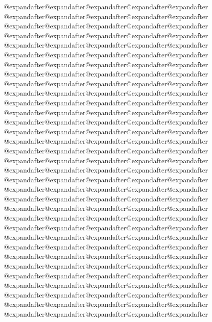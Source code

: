 {{                  @expandafter@expandafter@expandafter@expandafter@expandafter%
                  @expandafter@expandafter@expandafter@expandafter@expandafter%
                  @expandafter@expandafter@expandafter@expandafter@expandafter%
                  @expandafter@expandafter@expandafter@expandafter@expandafter%
                  @expandafter@expandafter@expandafter@expandafter@expandafter%
                  @expandafter@expandafter@expandafter@expandafter@expandafter%
                  @expandafter@expandafter@expandafter@expandafter@expandafter%
                  @expandafter@expandafter@expandafter@expandafter@expandafter%
                  @expandafter@expandafter@expandafter@expandafter@expandafter%
                  @expandafter@expandafter@expandafter@expandafter@expandafter%
                  @expandafter@expandafter@expandafter@expandafter@expandafter%
                  @expandafter@expandafter@expandafter@expandafter@expandafter%
                  @expandafter@expandafter@expandafter@expandafter@expandafter%
                  @expandafter@expandafter@expandafter@expandafter@expandafter%
                  @expandafter@expandafter@expandafter@expandafter@expandafter%
                  @expandafter@expandafter@expandafter@expandafter@expandafter%
                  @expandafter@expandafter@expandafter@expandafter@expandafter%
                  @expandafter@expandafter@expandafter@expandafter@expandafter%
                  @expandafter@expandafter@expandafter@expandafter@expandafter%
                  @expandafter@expandafter@expandafter@expandafter@expandafter%
                  @expandafter@expandafter@expandafter@expandafter@expandafter%
                  @expandafter@expandafter@expandafter@expandafter@expandafter%
                  @expandafter@expandafter@expandafter@expandafter@expandafter%
                  @expandafter@expandafter@expandafter@expandafter@expandafter%
                  @expandafter@expandafter@expandafter@expandafter@expandafter%
                  @expandafter@expandafter@expandafter@expandafter@expandafter%
                  @expandafter@expandafter@expandafter@expandafter@expandafter%
                  @expandafter@expandafter@expandafter@expandafter@expandafter%
                  @expandafter@expandafter@expandafter@expandafter@expandafter%
                  @expandafter@expandafter@expandafter@expandafter@expandafter%
                  @expandafter@expandafter@expandafter@expandafter@expandafter%
                  @expandafter@expandafter@expandafter@expandafter@expandafter%
                  @expandafter@expandafter@expandafter@expandafter@expandafter%
}}
